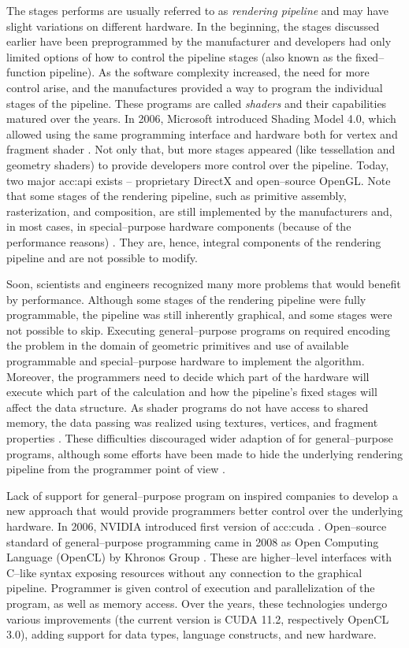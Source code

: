 The stages \gpu performs are usually referred to as \emph{rendering pipeline} and may have slight variations on different hardware. In the beginning, the stages discussed earlier have been preprogrammed by the manufacturer and developers had only limited options of how to control the pipeline stages (also known as the fixed--function pipeline). As the software complexity increased, the need for more control arise, and the manufactures provided a way to program the individual stages of the pipeline. These programs are called \emph{shaders} and their capabilities matured over the years. In 2006, Microsoft introduced Shading Model 4.0, which allowed using the same programming interface and hardware both for vertex and fragment shader \citep{DirectX10}. Not only that, but more stages appeared (like tessellation and geometry shaders) to provide developers more control over the pipeline. Today, two major \acrshort{acc:api} exists -- proprietary  DirectX and open--source OpenGL. Note that some stages of the rendering pipeline, such as primitive assembly, rasterization, and composition, are still implemented by the \gpu manufacturers and, in most cases, in special--purpose hardware components (because of the performance reasons) \citep{SoftwareRasterization}. They are, hence, integral components of the rendering pipeline and are not possible to modify.

Soon, scientists and engineers recognized many more problems that would benefit by \gpu performance. Although some stages of the rendering pipeline were fully programmable, the pipeline was still inherently graphical, and some stages were not possible to skip. Executing general--purpose programs on \gpu required encoding the problem in the domain of geometric primitives and use of available programmable and special--purpose hardware to implement the algorithm. Moreover, the programmers need to decide which part of the hardware will execute which part of the calculation and how the pipeline's fixed stages will affect the data structure. As shader programs do not have access to shared memory, the data passing was realized using textures, vertices, and fragment properties \citep{GPUComputingOwens}. These difficulties discouraged wider adaption of \gpu for general--purpose programs, although some efforts have been made to hide the underlying rendering pipeline from the programmer point of view \citep{BrookGPU}.

Lack of support for general--purpose program on \gpu inspired companies to develop a new approach that would provide programmers better control over the underlying hardware. In 2006, NVIDIA introduced first version of \acrfull{acc:cuda} \citep{CUDAabout}. Open--source standard of general--purpose \gpu programming came in 2008 as Open Computing Language (OpenCL) by Khronos Group \citep{OpenCLRelease}. These are higher--level interfaces with C--like syntax exposing \gpu resources without any connection to the graphical pipeline. Programmer is given control of execution and parallelization of the program, as well as memory access. Over the years, these technologies undergo various improvements (the current version is CUDA 11.2, respectively OpenCL 3.0), adding support for data types, language constructs, and new hardware.

